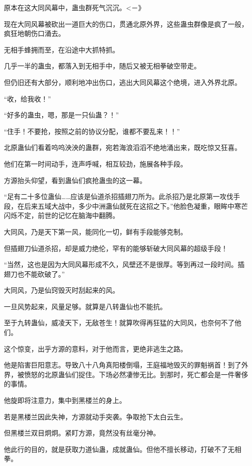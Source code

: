 
\begin{this_body}

原本在这大同风幕中，蛊虫群死气沉沉。<－》

现在大同风幕被砍出一道巨大的伤口，贯通北原外界，这些蛊虫群像是疯了一般，疯狂地朝伤口涌去。

无相手蜂拥而至，在沿途中大抓特抓。

几乎一半的蛊虫，都落入到无相手中，随后又被无相拳破空带走。

但仍旧还有大部分，顺利地冲出伤口，逃出大同风幕这个绝境，进入外界北原。

“收，给我收！”

“好多的蛊虫，嗯，那是一只仙蛊？！”

“住手！不要抢，按照之前的协议分配，谁都不要乱来！！”

北原蛊仙们看着呜呜泱泱的蛊群，宛若海浪滔滔不绝地涌出来，既吃惊又狂喜。

他们在第一时间动手，连声呼喊，相互较劲，施展各种手段。

方源抬头仰望，看到蛊仙们疯抢蛊虫的这一幕。

“足有二十多位蛊仙……应该是仙道杀招插翅刀所为。此杀招乃是北原第一攻伐手段，在后来五域大战中，多少中洲蛊仙就死在这招之下。”他脸色凝重，眼眸中寒芒闪烁不定，前世的记忆在脑海中翻腾。

大同风，乃是天下第一风，能同化一切，鲜有手段能够克制。

但插翅刀仙道杀招，却是威力绝伦，罕有的能够斩破大同风幕的超级手段！

“当然，这也是因为大同风幕形成不久，风壁还不是很厚。等到再过一段时间。插翅刀也不能砍破了。”

大同风，乃是仙窍毁灭时刮起来的风。

一旦风势起来，风量足够。就算是八转蛊仙也不能抗。

至于九转蛊仙，威凌天下，无敌苍生！就算吹得再狂猛的大同风，也奈何不了他们。

这个惊变，出乎方源的意料，对于他而言，更绝非逃生之路。

他是陷害巨阳意志。导致八十八角真阳楼倒塌，王庭福地毁灭的罪魁祸首！到了外界，被愤怒的北原蛊仙们捉住。下场必然凄惨无比。到那时，死亡都会是一件奢侈的事情。

他旋即将注意力，集中到黑楼兰的身上。

若是黑楼兰因此失神，方源就动手突袭。争取抢下太白云生。

但黑楼兰双目炯炯。紧盯方源，竟然没有丝毫分神。

他此行的目的，就是获取力道仙蛊，成就蛊仙。但他不擅长移动，打破不了无相拳。


\end{this_body}
